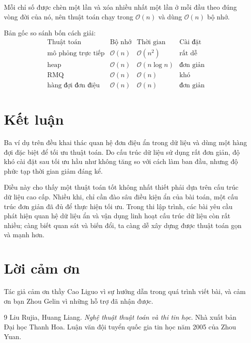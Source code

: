 \documentclass[11pt]{article}
\newcommand{\Oh}{\mathcal{O}}
\begin{document}
Mỗi chỉ số được chèn một lần và xóa nhiều nhất một lần ở mỗi đầu theo đúng
vòng đời của nó, nên thuật toán chạy trong \(\Oh(n)\) và dùng \(\Oh(n)\) bộ
nhớ.

Bản gốc so sánh bốn cách giải:
\[
\begin{array}{llll}
\text{Thuật toán} & \text{Bộ nhớ} & \text{Thời gian} & \text{Cài đặt}\\
\hline
\text{mô phỏng trực tiếp} & \Oh(n) & \Oh(n^2) & \text{rất dễ}\\
\text{heap} & \Oh(n) & \Oh(n\log n) & \text{đơn giản}\\
\text{RMQ} & \Oh(n) & \Oh(n) & \text{khó}\\
\text{hàng đợi đơn điệu} & \Oh(n) & \Oh(n) & \text{đơn giản}
\end{array}
\]

\section{Kết luận}

Ba ví dụ trên đều khai thác quan hệ đơn điệu ẩn trong dữ liệu và dùng một hàng
đợi đặc biệt để tối ưu thuật toán. Do cấu trúc dữ liệu sử dụng rất đơn giản,
độ khó cài đặt sau tối ưu hầu như không tăng so với cách làm ban đầu, nhưng
độ phức tạp thời gian giảm đáng kể.

Điều này cho thấy một thuật toán tốt không nhất thiết phải dựa trên cấu trúc
dữ liệu cao cấp. Nhiều khi, chỉ cần đào sâu điều kiện ẩn của bài toán, một
cấu trúc đơn giản đã đủ để thực hiện tối ưu. Trong thi lập trình, các bài yêu
cầu phát hiện quan hệ dữ liệu ẩn và vận dụng linh hoạt cấu trúc dữ liệu còn
rất nhiều; càng biết quan sát và biến đổi, ta càng dễ xây dựng được thuật toán
gọn và mạnh hơn.

\section*{Lời cảm ơn}

Tác giả cảm ơn thầy Cao Liguo vì sự hướng dẫn trong quá trình viết bài, và
cảm ơn bạn Zhou Gelin vì những hỗ trợ đã nhận được.

\begin{thebibliography}{9}
Liu Rujia, Huang Liang. \emph{Nghệ thuật thuật toán và thi tin học}. Nhà xuất
bản Đại học Thanh Hoa.
Luận văn đội tuyển quốc gia tin học năm 2005 của Zhou Yuan.
\end{thebibliography}
\end{document}
